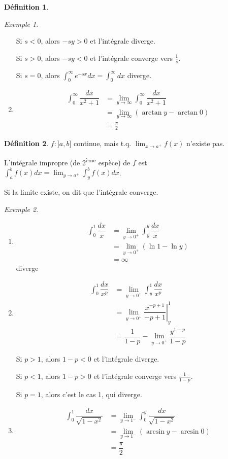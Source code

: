 \documentclass{report}
\newcommand*{\dlim}[3]{\displaystyle\lim_{#1 \to #2}#3}
\newcommand*{\dint}[3]{\displaystyle\int_{#1}^{#2}#3}
\theoremstyle{definition}
\newtheorem*{defin}{D\'efinition}
\theoremstyle{remark}
\newtheorem*{exem}{Exemple}
\begin{document}
\begin{defin}
\begin{exem}
\begin{enumerate}
				Si $s<0$, alors $-sy>0$ et l'int\'egrale diverge.

				Si $s>0$, alors $-sy<0$ et l'int\'egrale converge vers $\frac{1}{s}$.

				Si $s=0$, alors $\dint{0}{\infty}{e^{-sx}dx} = \dint{0}{\infty}{dx}$ diverge.
				\item \begin{align*}
					\dint{0}{\infty}{\dfrac{dx}{x^2+1}}&= \dlim{y}{\infty}{\dint{0}{\infty}{\dfrac{dx}{x^2+1}}}\\
					&= \dlim{y}{\infty}{(\arctan y - \arctan0)}\\
					&= \frac{\pi}{2}
				\end{align*}
			\end{enumerate}
		\end{exem}
	\end{defin}
	\begin{defin}
		$f:]a,b]$ continue, mais t.q. $\dlim{x}{a^+}{f(x)}$ n'existe pas.

		L'int\'egrale impropre (de 2\textsuperscript{\`eme} esp\`ece) de $f$ est $\dint{a}{b}{f}(x)dx = \dlim{y}{a^+}{\dint{y}{b}{f(x)dx}}$.

		Si la limite existe, on dit que l'int\'egrale converge.
		\begin{exem}~

			\begin{enumerate}
				\item \begin{align*}
					\dint{0}{1}{\dfrac{dx}{x}}&= \dlim{y}{0^+}{\dint{y}{b}{\dfrac{dx}{x}}}\\
					&= \dlim{y}{0^+}{(\ln1-\ln y)}\\
					&= \infty
				\end{align*}
				diverge
				\item \begin{align*}
					\dint{0}{1}{\dfrac{dx}{x^p}}&= \dlim{y}{0^+}{\dint{y}{1}{\dfrac{dx}{x^p}}}\\
					&= \left. \dlim{y}{0^+}{\dfrac{x^{-p+1}}{-p+1}} \right|^1_y\\
					&= \dfrac{1}{1-p} - \dlim{y}{0^+}{\dfrac{y^{1-p}}{1-p}}
				\end{align*}

				Si $p>1$, alors $1-p<0$ et l'int\'egrale diverge.

				Si $p<1$, alors $1-p>0$ et l'int\'egrale converge vers $\frac{1}{1-p}$.

				Si $p=1$, alors c'est le cas 1, qui diverge.
				\item \begin{align*}
					\dint{0}{1}{\dfrac{dx}{\sqrt{1-x^2}}}&= \dlim{y}{1^-}{\dint{0}{y}{\dfrac{dx}{\sqrt{1-x^2}}}}\\
					&= \dlim{y}{1^-}{(\arcsin y - \arcsin0)}\\
					&= \dfrac{\pi}{2}
				\end{align*}
			\end{enumerate}
		\end{exem}
	\end{defin}
\end{document}
